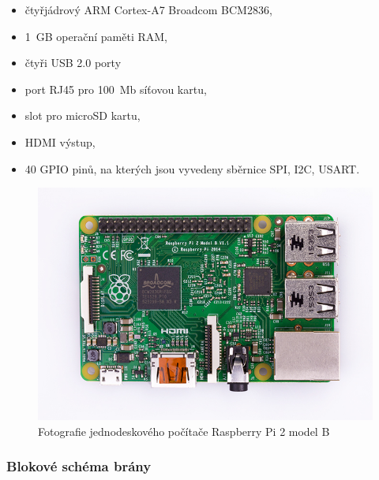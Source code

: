 \documentclass[12pt,a4paper,oneside]{article}
\begin{document}
\begin{itemize}
  \item čtyřjádrový ARM Cortex-A7 Broadcom BCM2836,
  \item 1~GB operační paměti RAM,
  \item čtyři USB 2.0 porty
  \item port RJ45 pro 100~Mb síťovou kartu,
  \item slot pro microSD kartu,
  \item HDMI výstup,
  \item 40 GPIO pinů, na kterých jsou vyvedeny sběrnice SPI, I2C, USART.
\end{itemize}

\begin{figure}[H]
\centering
\label{fig:foto/rpi2}
\includegraphics[width = 128mm]{img/foto/rpi2.jpg}
\caption{Fotografie jednodeskového počítače Raspberry Pi 2 model B}
\end{figure}

\newpage

\subsubsection{Blokové schéma brány}
\end{document}
